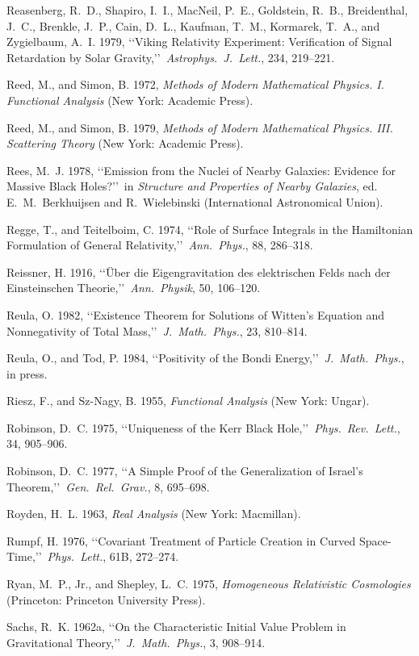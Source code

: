
\item Reasenberg, R.~D., Shapiro, I.~I., MacNeil, P.~E., Goldstein, R.~B., Breidenthal, J.~C., Brenkle, J.~P., Cain, D.~L., Kaufman, T.~M., Kormarek, T.~A., and Zygielbaum, A.~I. 1979, \lq\lq Viking Relativity Experiment: Verification of Signal Retardation by Solar Gravity,\rq\rq\ \emph{Astrophys.\ J.\ Lett.}, 234, 219--221.
\item Reed, M., and Simon, B. 1972, \emph{Methods of Modern Mathematical Physics. I. Functional Analysis} (New York: Academic Press).
\item Reed, M., and Simon, B. 1979, \emph{Methods of Modern Mathematical Physics. III. Scattering Theory} (New York: Academic Press).
\item Rees, M.~J. 1978, \lq\lq Emission from the Nuclei of Nearby Galaxies: Evidence for Massive Black Holes?\rq\rq\ in \emph{Structure and Properties of Nearby Galaxies}, ed. E.~M.~Berkhuijsen and R.~Wielebinski (International Astronomical Union).
\item Regge, T., and Teitelboim, C. 1974, \lq\lq Role of Surface Integrals in the Hamiltonian Formulation of General Relativity,\rq\rq\ \emph{Ann.\ Phys.}, 88, 286--318.
\item Reissner, H. 1916, \lq\lq {\"U}ber die Eigengravitation des elektrischen Felds nach der Einsteinschen Theorie,\rq\rq\ \emph{Ann.\ Physik}, 50, 106--120.
\item Reula, O. 1982, \lq\lq Existence Theorem for Solutions of Witten's Equation and Nonnegativity of Total Mass,\rq\rq\ \emph{J.\ Math.\ Phys.}, 23, 810--814.
\item Reula, O., and Tod, P. 1984, \lq\lq Positivity of the Bondi Energy,\rq\rq\ \emph{J.\ Math.\ Phys.}, in press.
\item Riesz, F., and Sz-Nagy, B. 1955, \emph{Functional Analysis} (New York: Ungar).
\item Robinson, D.~C. 1975, \lq\lq Uniqueness of the Kerr Black Hole,\rq\rq\ \emph{Phys.\ Rev.\ Lett.}, 34, 905--906.
\item Robinson, D.~C. 1977, \lq\lq A Simple Proof of the Generalization of Israel's Theorem,\rq\rq\ \emph{Gen.\ Rel.\ Grav.}, 8, 695--698.
\item Royden, H.~L. 1963, \emph{Real Analysis} (New York: Macmillan).
\item Rumpf, H. 1976, \lq\lq Covariant Treatment of Particle Creation in Curved Space-Time,\rq\rq\ \emph{Phys.\ Lett.}, 61B, 272--274.
\item Ryan, M.~P., Jr., and Shepley, L.~C. 1975, \emph{Homogeneous Relativistic Cosmologies} (Princeton: Princeton University Press).
\item Sachs, R.~K. 1962a, \lq\lq On the Characteristic Initial Value Problem in Gravitational Theory,\rq\rq\ \emph{J.\ Math.\ Phys.}, 3, 908--914.

